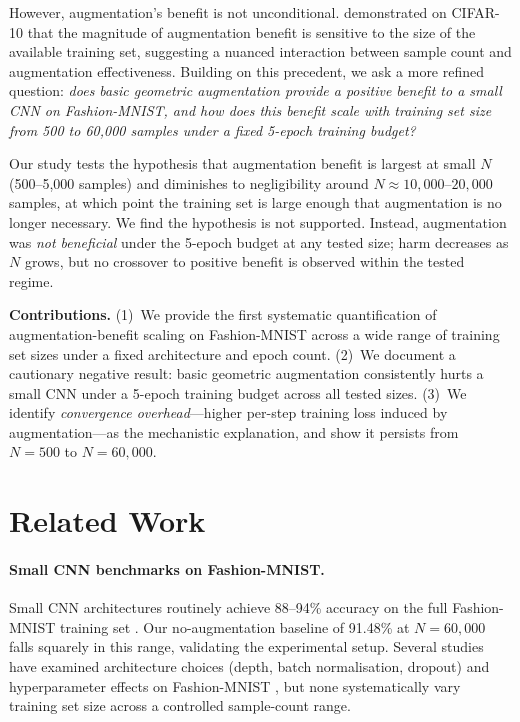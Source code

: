 \documentclass[11pt]{article}
\begin{document}
However, augmentation's benefit is not unconditional.
\citet{karada2020empirical} demonstrated on CIFAR-10 that the magnitude of
augmentation benefit is sensitive to the size of the available training set,
suggesting a nuanced interaction between sample count and augmentation
effectiveness.
Building on this precedent, we ask a more refined question: \emph{does basic
geometric augmentation provide a positive benefit to a small CNN on
Fashion-MNIST, and how does this benefit scale with training set size from
500 to 60,000 samples under a fixed 5-epoch training budget?}

Our study tests the hypothesis that augmentation benefit is largest at small
$N$ (500--5,000 samples) and diminishes to negligibility around
$N \approx 10{,}000$--$20{,}000$ samples, at which point the training set is
large enough that augmentation is no longer necessary.
We find the hypothesis is not supported.
Instead, augmentation was \emph{not beneficial} under the 5-epoch budget at any
tested size; harm decreases as $N$ grows, but no crossover to positive benefit
is observed within the tested regime.

\textbf{Contributions.}
(1)~We provide the first systematic quantification of augmentation-benefit
scaling on Fashion-MNIST across a wide range of training set sizes under a
fixed architecture and epoch count.
(2)~We document a cautionary negative result: basic geometric augmentation
consistently hurts a small CNN under a 5-epoch training budget across all
tested sizes.
(3)~We identify \emph{convergence overhead}---higher per-step training loss
induced by augmentation---as the mechanistic explanation, and show it persists
from $N{=}500$ to $N{=}60{,}000$.

\section{Related Work}
\label{sec:related}

\paragraph{Small CNN benchmarks on Fashion-MNIST.}
Small CNN architectures routinely achieve 88--94\% accuracy on the full
Fashion-MNIST training set \citep{mukhamediev2024state,yee2026based}.
Our no-augmentation baseline of 91.48\% at $N{=}60{,}000$ falls squarely in
this range, validating the experimental setup.
Several studies have examined architecture choices (depth, batch normalisation,
dropout) and hyperparameter effects on Fashion-MNIST
\citep{meshkini2019analysis,xhaferra2022classification}, but none systematically
vary training set size across a controlled sample-count range.
\end{document}
